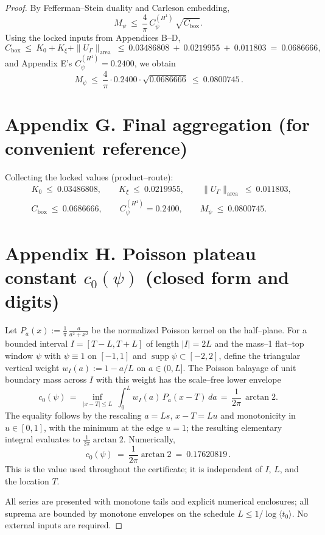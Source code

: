 \documentclass[11pt]{article}
\providecommand{\Mpsilocked}{0.0800745}%
\theoremstyle{definition}
\theoremstyle{remark}
\begin{document}
\begin{proof}
By Fefferman–Stein duality and Carleson embedding,
\[
M_\psi\ \le\ \frac{4}{\pi}\,C_\psi^{(H^1)}\,\sqrt{C_{\mathrm{box}}}.
\]
Using the locked inputs from Appendices B–D,
\[
C_{\mathrm{box}}\ \le\ K_0+K_\xi+\|U_\Gamma\|_{\mathrm{area}}
\ \le\ 0.03486808\ +\ 0.0219955\ +\ 0.011803
\ =\ 0.0686666,
\]
and Appendix E's $C_\psi^{(H^1)}=0.2400$, we obtain
\[
\boxed{\,M_\psi\ \le\ \frac{4}{\pi}\cdot 0.2400\cdot \sqrt{0.0686666}\ \le\ \Mpsilocked\,}.
\]

\section*{Appendix G. Final aggregation (for convenient reference)}
Collecting the locked values (product–route):
\begin{align}
&\boxed{K_0\ \le\ 0.03486808},\qquad
\boxed{K_\xi\ \le\ 0.0219955},\qquad
\boxed{\|U_\Gamma\|_{\mathrm{area}}\ \le\ 0.011803},\\
&\boxed{C_{\mathrm{box}}\ \le\ 0.0686666},\qquad
\boxed{C_\psi^{(H^1)}=0.2400},\qquad
\boxed{M_\psi\ \le\ \Mpsilocked}.
\end{align}

\section*{Appendix H. Poisson plateau constant $c_0(\psi)$ (closed form and digits)}\label{app:c0-closed}
Let $P_a(x):=\tfrac{1}{\pi}\,\tfrac{a}{a^2+x^2}$ be the normalized Poisson kernel on the half--plane. For a bounded interval $I=[T{-}L,T{+}L]$ of length $|I|=2L$ and the mass--1 flat--top window $\psi$ with $\psi\equiv 1$ on $[-1,1]$ and $\operatorname{supp}\psi\subset[-2,2]$, define the triangular vertical weight $w_I(a):=1-a/L$ on $a\in(0,L]$. The Poisson balayage of unit boundary mass across $I$ with this weight has the scale--free lower envelope
\[
  c_0(\psi)
  \,=\, \inf_{|x-T|\le L}\ \int_0^{L} w_I(a)\,P_a(x{-}T)\,da
  \,=\, \frac{1}{2\pi}\,\arctan 2.
\]
The equality follows by the rescaling $a=Ls$, $x{-}T=Lu$ and monotonicity in $u\in[0,1]$, with the minimum at the edge $u=1$; the resulting elementary integral evaluates to $\tfrac{1}{2\pi}\arctan 2$. Numerically,
\[
  c_0(\psi)\ =\ \frac{1}{2\pi}\arctan 2\ =\ 0.17620819\,.
\]
This is the value used throughout the certificate; it is independent of $I$, $L$, and the location $T$.

\medskip
\noindent All series are presented with monotone tails and explicit numerical enclosures; all suprema are bounded by monotone envelopes on the schedule $L\le 1/\log\langle t_0\rangle$. No external inputs are required.


\end{proof}
\end{document}
